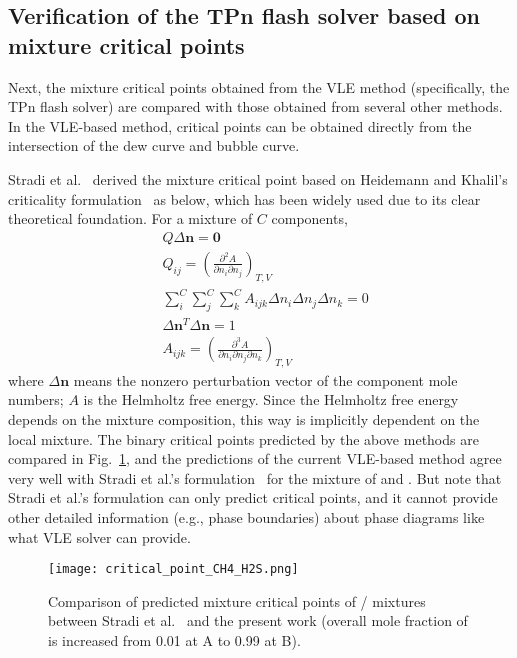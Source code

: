     \subsection{Verification of the TPn flash solver based on mixture critical points}
    Next, the mixture critical points obtained from the VLE method (specifically, the TPn flash solver) are compared with those obtained from several other methods. In the VLE-based method, critical points can be obtained directly from the intersection of the dew curve and bubble curve.

    Stradi et al.~\cite{stradi2001reliable} derived the mixture critical point based on Heidemann and Khalil's criticality formulation~\cite{heidemann1980calculation} as below, which has been widely used due to its clear theoretical foundation. For a mixture of $C$ components,
    \begin{align}
         & Q\Delta \mathbf n=\mathbf0                                                                          \\
         & Q_{ij}=\left( \frac{\partial^2A}{\partial n_i \partial n_j}\right)_{T,V}                            \\
         & \sum_i^{C}\sum_{j}^{C}\sum_{k}^{C}A_{ijk}\Delta n_i\Delta n_{j}\Delta n_{k}=0                       \\
         & \Delta \mathbf n^{T}\Delta \mathbf n=1                                                              \\
         & A_{ijk}=\left( \frac{\partial^3A}{\partial n_i \partial n_j\partial n_k}\right)_{T,V} \label{eq:19}
    \end{align}
    where $\Delta \mathbf n$ means the nonzero perturbation vector of the component mole numbers; $A$ is the Helmholtz free energy. Since the Helmholtz free energy depends on the mixture composition, this way is implicitly dependent on the local mixture. The binary critical points predicted by the above methods are compared in Fig.~\ref{v2}, and the predictions of the current VLE-based method agree very well with Stradi et al.'s formulation~\cite{stradi2001reliable} for the mixture of  and . But note that Stradi et al.'s formulation can only predict critical points, and it cannot provide other detailed information (e.g., phase boundaries) about phase diagrams like what VLE solver can provide.


    \begin{figure}[htbp]
        \begin{center}
            \texttt{[image: critical\_point\_CH4\_H2S.png]}
        \end{center}
        \caption{Comparison of predicted mixture critical points of / mixtures between Stradi et al.~\cite{stradi2001reliable} and the present work (overall mole fraction of  is increased from 0.01 at A to 0.99 at B).
        }
        \label{v2}
    \end{figure}

